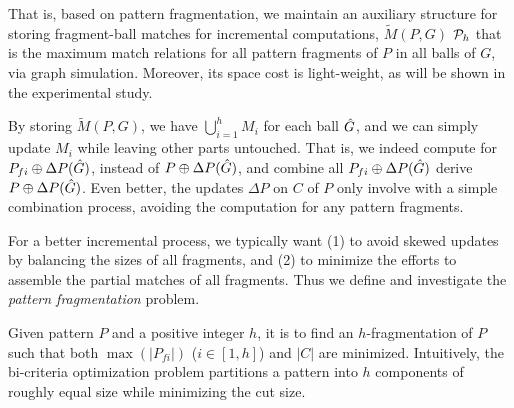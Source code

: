 That is, based on pattern fragmentation, we maintain 
an auxiliary structure for storing fragment-ball matches for incremental computations,
\ie $\tilde{M}(P,G)$ \wrt ${\cal P}_{h}$ that is the maximum match relations for all pattern fragments of $P$ in all balls of $G$, via graph simulation.
Moreover, its space cost is light-weight, as will be shown in the experimental study.



By storing $\tilde{M}(P,G)$, we have $\bigcup_{i=1}^{h}M_{i}$ for each ball $\hat{G}{}$,
and we can simply update $M_i$ while leaving other parts untouched. That is, we indeed compute for $P_{fi}\oplus\Delta P(\hat{G}{})$, instead of $P\oplus\Delta P(\hat{G}{})$, and combine all $P_{fi}\oplus\Delta P(\hat{G}{})$ derive $P\oplus\Delta P(\hat{G}{})$.
Even better, the updates $\Delta P$ on $C$ of $P$ only involve with a simple combination process, avoiding the computation for any pattern fragments.


For a better incremental process, we typically want (1) to avoid skewed updates by balancing the sizes of all fragments, and (2) to minimize the efforts to assemble the partial matches of all fragments.
Thus we define and investigate the {\em pattern fragmentation} problem. 

Given pattern $P$ and a positive integer $h$, it is to find
an $h$-fragmentation of $P$ such that both $\max(|P_{fi}|)$ ($i\in[1,h]$) and $|C|$ are minimized.
Intuitively, the bi-criteria optimization problem partitions a pattern into $h$ components of roughly equal size while minimizing the cut size.

\eat{%
Given $P$ and a positive integer $h$, the {\em pattern fragmentation}  problem is to find
an $h$-fragmentation of $P$ such that both $\max(|P_{fi}|)$ ($i\in[1,h]$) and $|C|$ are minimized.
%
Intuitively, we want (1)  to avoid skewed updates by making all fragments roughly the same size and (2) to  minimize the efforts to assemble the partial matches of all fragments.
}%

